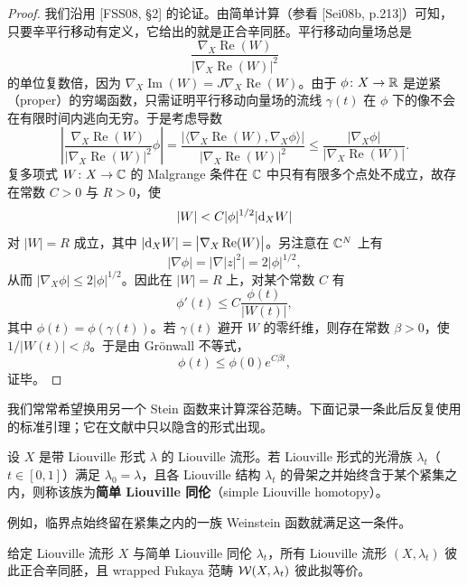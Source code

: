 \begin{proof}
我们沿用 [FSS08, §2] 的论证。由简单计算（参看 [Sei08b, p.213]）可知，只要辛平行移动有定义，它给出的就是正合辛同胚。平行移动向量场总是
\[
\frac{\nabla_X\operatorname{Re}(W)}{\bigl|\nabla_X\operatorname{Re}(W)\bigr|^2}
\]
的单位复数倍，因为 $\nabla_X\operatorname{Im}(W)=J\nabla_X\operatorname{Re}(W)$。由于 $\phi\colon X\to\mathbb{R}$ 是逆紧（proper）的穷竭函数，只需证明平行移动向量场的流线 $\gamma(t)$ 在 $\phi$ 下的像不会在有限时间内逃向无穷。于是考虑导数
\[
\left|\frac{\nabla_X\operatorname{Re}(W)}{\bigl|\nabla_X\operatorname{Re}(W)\bigr|^2}\phi\right|
=\frac{\bigl|\langle\nabla_X\operatorname{Re}(W),\nabla_X\phi\rangle\bigr|}
{\bigl|\nabla_X\operatorname{Re}(W)\bigr|^2}
\le\frac{|\nabla_X\phi|}{\bigl|\nabla_X\operatorname{Re}(W)\bigr|}.
\]
复多项式 $W\colon X\to\mathbb{C}$ 的 Malgrange 条件在 $\mathbb{C}$ 中只有有限多个点处不成立，故存在常数 $C>0$ 与 $R>0$，使
\[
|W|<C|\phi|^{1/2}|\mathrm{d}_XW|
\]
对 $|W|=R$ 成立，其中 $|\mathrm{d}_XW|=\bigl|\nabla_X\operatorname{Re}(W)\bigr|$。另注意在 $\mathbb{C}^N$ 上有
\[
|\nabla\phi|=\bigl|\nabla|z|^2\bigr|=2|\phi|^{1/2},
\]
从而 $|\nabla_X\phi|\le2|\phi|^{1/2}$。因此在 $|W|=R$ 上，对某个常数 $C$ 有
\[
\phi'(t)\le C\frac{\phi(t)}{|W(t)|},
\]
其中 $\phi(t)=\phi(\gamma(t))$。若 $\gamma(t)$ 避开 $W$ 的零纤维，则存在常数 $\beta>0$，使 $1/|W(t)|<\beta$。于是由 Gr{\"o}nwall 不等式，
\[
\phi(t)\le\phi(0)e^{C\beta t},
\]
证毕。
\end{proof}


我们常常希望换用另一个 Stein 函数来计算深谷范畴。下面记录一条此后反复使用的标准引理；它在文献中只以隐含的形式出现。

\begin{definition}\label{def:simple-liouville}\label{def:2-1-5}
设 $X$ 是带 Liouville 形式 $\lambda$ 的 Liouville 流形。若 Liouville 形式的光滑族 $\lambda_t$（$t\in[0,1]$）满足 $\lambda_0=\lambda$，且各 Liouville 结构 $\lambda_t$ 的骨架之并始终含于某个紧集之内，则称该族为\textbf{简单 Liouville 同伦}（simple Liouville homotopy）。
\end{definition}


例如，临界点始终留在紧集之内的一族 Weinstein 函数就满足这一条件。

\begin{lemma}\label{lem:simple-homotopy}\label{lem:2-1-6}
给定 Liouville 流形 $X$ 与简单 Liouville 同伦 $\lambda_t$，所有 Liouville 流形 $(X,\lambda_t)$ 彼此正合辛同胚，且 wrapped Fukaya 范畴 $\mathcal{W}(X,\lambda_t)$ 彼此拟等价。
\end{lemma}

